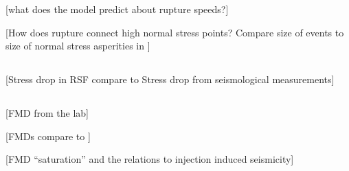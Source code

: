 \documentclass[preprint,1p, 10pt,authoryear]{elsarticle}
\begin{document}
[what does the model predict about rupture speeds?]

[How does rupture connect high normal stress points?  Compare size of events to size of normal stress asperities in \citet{Selvadurai2017}]

\subsection{}
[Stress drop in RSF compare to Stress drop from seismological measurements]

\subsection{}
[FMD from the lab]

[FMDs compare to \citet{Villiger2019}]

[FMD ``saturation'' and the relations to injection induced seismicity]
\end{document}
